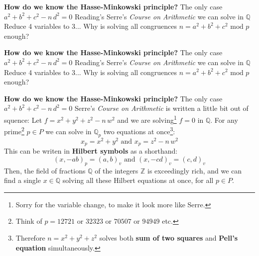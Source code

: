 \documentclass[12pt]{article}
\begin{document}
\newpage

\noindent\textbf{How do we know the Hasse-Minkowski principle?  }
\newline \newline
The only case $a^2 + b^2 + c^2 - n \, d^2 = 0$ 
\newline \newline
Reading's Serre's \textit{Course on Arithmetic} we can solve in $\mathbb{Q}$
\newline \newline
Reduce 4 variables to 3...
\newline \newline
Why is solving all congruences $n = a^2 + b^2 + c^2 \textrm{ mod }p$ enough?

\newpage

\noindent\textbf{How do we know the Hasse-Minkowski principle?  }
\newline \newline
The only case $a^2 + b^2 + c^2 - n \, d^2 = 0$ 
\newline \newline
Reading's Serre's \textit{Course on Arithmetic} we can solve in $\mathbb{Q}$
\newline \newline
Reduce 4 variables to 3...
\newline \newline
Why is solving all congruences $n = a^2 + b^2 + c^2 \textrm{ mod }p$ enough?


\newpage

\noindent\textbf{How do we know the Hasse-Minkowski principle?  }
\newline \newline
The only case $a^2 + b^2 + c^2 - n \, d^2 = 0$ 
\newline \newline
Serre's \textit{Course on Arithmetic} is written a little bit out of squence:
\newline \newline
Let $f = x^2 + y^2 + z^2 - n \, w^2 $ and we are solving\footnote{Sorry for the variable change, to make it look more like Serre.} $f = 0$ in $\mathbb{Q}$.
\newline \newline
For any prime\footnote{Think of $p = 12721$ or $ 32323$ or $70507$ or $94949$ etc.} $p \in P$ we can solve in $\mathbb{Q}_p$ two equations at once\footnote{Therefore $n = x^2 + y^2 + z^2$ solves both \textbf{sum of two squares} and \textbf{Pell's equation} simultaneously.}:
$$x_p = x^2 + y^2 \text{ and }x_p = z^2 - n\, w^2 $$
This can be writen in \textbf{Hilbert symbols} as a shorthand:
$$(x, -ab)_p = (a,b)_v \text{ and }(x,-cd)_v=(c,d)_v $$
Then, the field of fractions $\mathbb{Q}$ of the integers $\mathbb{Z}$ is exceedingly rich, and we can find a single $x \in \mathbb{Q}$ solving all these Hilbert equations at once, for all $p \in P$.
\end{document}
